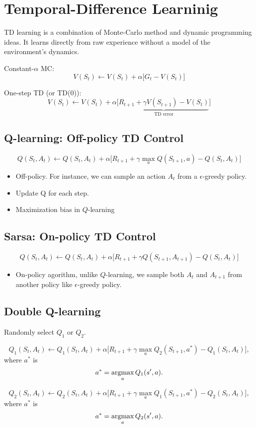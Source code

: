 
\section{Temporal-Difference Learninig}

TD learning is a combination of Monte-Carlo method and dynamic programming ideas. It learns directly from raw experience without a model of the environment's dynamics. 


Constant-$\alpha$ MC:
$$V(S_t) \leftarrow V(S_t)+ \alpha \Big[G_t-V(S_t)\Big] $$

One-step TD (or TD(0)):
$$V(S_t) \leftarrow V(S_t)+ \alpha \Big[\underbrace{R_{t+1}+\gamma V(S_{t+1})-V(S_t)}_{\text{TD error}}\Big] $$


\subsection{Q-learning: Off-policy TD Control}

$$Q(S_t, A_t) \leftarrow Q(S_t, A_t)+ \alpha \Big[R_{t+1}+\gamma \max_a Q(S_{t+1}, a)-Q(S_t, A_t)\Big] $$

\begin{itemize}
	\item Off-policy. For instance, we can sample an action $A_t$ from a $\epsilon$-greedy policy. 
	\item Update Q for each step.
	\item Maximization bias in $Q$-learning
\end{itemize}

\subsection{Sarsa: On-policy TD Control}
$$Q(S_t, A_t) \leftarrow Q(S_t, A_t)+ \alpha \Big[R_{t+1}+\gamma Q(S_{t+1}, A_{t+1})-Q(S_t, A_t)\Big] $$
\begin{itemize}
	\item On-policy agorithm, unlike $Q$-learning, we sample both $A_t$ and $A_{t+1}$ from another policy like $\epsilon$-greedy policy. 
\end{itemize}


\subsection{Double Q-learning}

Randomly select $Q_1$ or $Q_2$.

$$Q_1(S_t, A_t) \leftarrow Q_1(S_t, A_t)+ \alpha \Big[R_{t+1}+\gamma \max_a Q_2(S_{t+1}, a^*)-Q_1(S_t, A_t)\Big], $$
where $a^*$ is 
$$a^* = \operatorname*{\operatorname{argmax}}_a Q_1(s',a).$$

$$Q_2(S_t, A_t) \leftarrow Q_2(S_t, A_t)+ \alpha \Big[R_{t+1}+\gamma \max_a Q_1(S_{t+1}, a^*)-Q_2(S_t, A_t)\Big], $$
where $a^*$ is 
$$a^* = \operatorname*{\operatorname{argmax}}_a Q_2(s',a).$$
